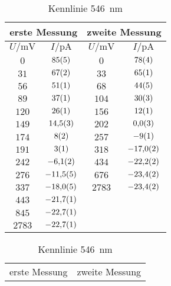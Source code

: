 \begin{table}[H]
   \centering
\parbox{0.475\linewidth}{\centering
\caption{Kennlinie \SI{578}{nm}}
\begin{tabular}{cc||cc}
\hline\multicolumn{2}{c||}{erste Messung} & \multicolumn{2}{c}{zweite Messung}\\

\hline
$U / \unit{\milli\volt}$ & $I / \unit{\pico\ampere}$ & $U / \unit{\milli\volt}$ & $I / \unit{\pico\ampere}$ \\ 
\hline
$\num{0}$ & $\num{85\pm 5}$ & $\num{0}$ & $\num{78\pm 4}$ \\
$\num{31}$ & $\num{67\pm 2}$ & $\num{33}$ & $\num{65\pm 1}$ \\
$\num{56}$ & $\num{51\pm 1}$ & $\num{68}$ & $\num{44\pm 5}$ \\
$\num{89}$ & $\num{37\pm 1}$ & $\num{104}$ & $\num{30\pm 3}$ \\
$\num{120}$ & $\num{26\pm 1}$ & $\num{156}$ & $\num{12\pm 1}$ \\
$\num{149}$ & $\num{14.5\pm 0.3}$ & $\num{202}$ & $\num{0.0\pm 0.3}$ \\
$\num{174}$ & $\num{8\pm 2}$ & $\num{257}$ & $\num{-9\pm 1}$ \\
$\num{191}$ & $\num{3\pm 1}$ & $\num{318}$ & $\num{-17.0\pm 0.2}$ \\
$\num{242}$ & $\num{-6.1\pm 0.2}$ & $\num{434}$ & $\num{-22.2\pm 0.2}$ \\
$\num{276}$ & $\num{-11.5\pm 0.5}$ & $\num{676}$ & $\num{-23.4\pm 0.2}$ \\
$\num{337}$ & $\num{-18.0\pm 0.5}$ & $\num{2783}$ & $\num{-23.4\pm 0.2}$ \\
$\num{443}$ & $\num{-21.7\pm 0.1}$ &    &    \\
$\num{845}$ & $\num{-22.7\pm 0.1}$ &    &    \\
$\num{2783}$ & $\num{-22.7\pm 0.1}$ &    &    \\
\hline\end{tabular}
\label{kennlinie_578nm}
}\quad\parbox{0.475\linewidth}{\centering
\caption{Kennlinie \SI{546}{nm}}
\begin{tabular}{cc||cc}
\hline\multicolumn{2}{c||}{erste Messung} & \multicolumn{2}{c}{zweite Messung}\\


\end{tabular}}
\end{table}
